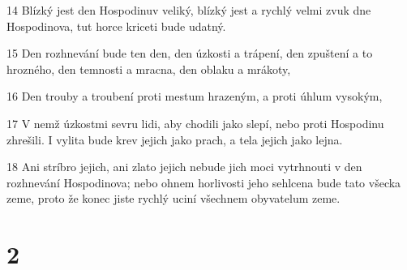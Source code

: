 \par 14 Blízký jest den Hospodinuv veliký, blízký jest a rychlý velmi zvuk dne Hospodinova, tut horce kriceti bude udatný.
\par 15 Den rozhnevání bude ten den, den úzkosti a trápení, den zpuštení a to hrozného, den temnosti a mracna, den oblaku a mrákoty,
\par 16 Den trouby a troubení proti mestum hrazeným, a proti úhlum vysokým,
\par 17 V nemž úzkostmi sevru lidi, aby chodili jako slepí, nebo proti Hospodinu zhrešili. I vylita bude krev jejich jako prach, a tela jejich jako lejna.
\par 18 Ani stríbro jejich, ani zlato jejich nebude jich moci vytrhnouti v den rozhnevání Hospodinova; nebo ohnem horlivosti jeho sehlcena bude tato všecka zeme, proto že konec jiste rychlý uciní všechnem obyvatelum zeme.

\chapter{2}

